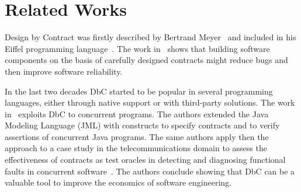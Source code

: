 \section{Related Works}\label{sec:relatedWorks}

Design by Contract  was firstly described by Bertrand Meyer~\cite{ii1} and included %
in his Eiffel programming language~\cite{ii}. %
The work in~\cite{ii} shows that building software components on the basis of carefully designed contracts might reduce bugs and then improve 
software reliability. %

In the last two decades DbC started to be popular in several programming languages, either through native support or with third-party solutions. 
The work in~\cite{Araujo2011} exploits DbC to concurrent programs. The authors extended the Java Modeling Language (JML) with constructs to specify  contracts %
and to %
verify assertions of concurrent Java programs. 
The same authors apply then the approach to a case study in %
the telecommunications domain to assess the effectiveness of contracts as test oracles in detecting and diagnosing functional faults in concurrent software~\cite{Araujo2014}. The authors conclude showing that DbC can be a valuable tool to improve the economics of software engineering.


